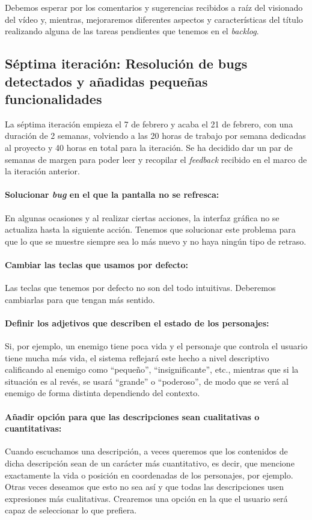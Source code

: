 Debemos esperar por los comentarios y sugerencias recibidos a raíz del visionado del vídeo y, mientras, mejoraremos diferentes aspectos y características del título realizando alguna de las tareas pendientes que tenemos en el \textit{backlog}.

\subsection{Séptima iteración: Resolución de bugs detectados y añadidas pequeñas funcionalidades}

La séptima iteración empieza el 7 de febrero y acaba el 21 de febrero, con una duración de 2 semanas, volviendo a las 20 horas de trabajo por semana dedicadas al proyecto y 40 horas en total para la iteración. Se ha decidido dar un par de semanas de margen para poder leer y recopilar el \textit{feedback} recibido en el marco de la iteración anterior.

\paragraph{Solucionar \textit{bug} en el que la pantalla no se refresca:} En algunas ocasiones y al realizar ciertas acciones, la interfaz gráfica no se actualiza hasta la siguiente acción. Tenemos que solucionar este problema para que lo que se muestre siempre sea lo más nuevo y no haya ningún tipo de retraso.

\paragraph{Cambiar las teclas que usamos por defecto:} Las teclas que tenemos por defecto no son del todo intuitivas. Deberemos cambiarlas para que tengan más sentido.

\paragraph{Definir los adjetivos que describen el estado de los personajes:} Si, por ejemplo, un enemigo tiene poca vida y el personaje que controla el usuario tiene mucha más vida, el sistema reflejará este hecho a nivel descriptivo calificando al enemigo como ``pequeño'', ``insignificante'', etc., mientras que si la situación es al revés, se usará ``grande'' o ``poderoso'', de modo que se verá al enemigo de forma distinta dependiendo del contexto.

\paragraph{Añadir opción para que las descripciones sean cualitativas o cuantitativas:} Cuando escuchamos una descripción, a veces queremos que los contenidos de dicha descripción sean de un carácter más cuantitativo, es decir, que mencione exactamente la vida o posición en coordenadas de los personajes, por ejemplo. Otras veces deseamos que esto no sea así y que todas las descripciones usen expresiones más cualitativas. Crearemos una opción en la que el usuario será capaz de seleccionar lo que prefiera.

